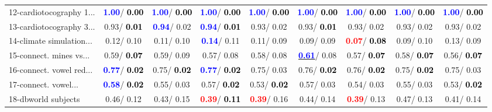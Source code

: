 \begin{table}[h]
\begin{center}
\begin{tabular}{lc|c|c|c|c|c|c|c}
12-cardiotocography 1... & \textcolor{blue}{\textbf{  1.00}}/\textcolor{black}{\textbf{  0.00}} & \textcolor{blue}{\textbf{  1.00}}/\textcolor{black}{\textbf{  0.00}} & \textcolor{blue}{\textbf{  1.00}}/\textcolor{black}{\textbf{  0.00}} & \textcolor{blue}{\textbf{  1.00}}/\textcolor{black}{\textbf{  0.00}} & \textcolor{blue}{\textbf{  1.00}}/\textcolor{black}{\textbf{  0.00}} & \textcolor{blue}{\textbf{  1.00}}/\textcolor{black}{\textbf{  0.00}} & \textcolor{blue}{\textbf{  1.00}}/\textcolor{black}{\textbf{  0.00}} & \textcolor{blue}{\textbf{  1.00}}/\textcolor{black}{\textbf{  0.00}} \\
13-cardiotocography 3... &   0.93/\textcolor{black}{\textbf{  0.01}} & \textcolor{blue}{\textbf{  0.94}}/  0.02 & \textcolor{blue}{\textbf{  0.94}}/\textcolor{black}{\textbf{  0.01}} &   0.93/  0.02 &   0.93/\textcolor{black}{\textbf{  0.01}} &   0.93/  0.02 &   0.93/  0.02 &   0.93/  0.02 \\
14-climate simulation... &   0.12/  0.10 &   0.11/  0.10 & \textcolor{blue}{\textbf{  0.14}}/  0.11 &   0.11/  0.09 &   0.09/  0.09 & \textcolor{red}{\textbf{  0.07}}/\textcolor{black}{\textbf{  0.08}} &   0.09/  0.10 &   0.13/  0.09 \\ \hline
15-connect. mines vs... &   0.59/\textcolor{black}{\textbf{  0.07}} &   0.59/  0.09 &   0.57/  0.08 &   0.58/  0.08 & \underline{\textcolor{blue}{\textbf{  0.61}}}/  0.08 &   0.57/\textcolor{black}{\textbf{  0.07}} &   0.58/\textcolor{black}{\textbf{  0.07}} &   0.56/\textcolor{black}{\textbf{  0.07}} \\
16-connect. vowel red... & \textcolor{blue}{\textbf{  0.77}}/\textcolor{black}{\textbf{  0.02}} &   0.75/\textcolor{black}{\textbf{  0.02}} & \textcolor{blue}{\textbf{  0.77}}/\textcolor{black}{\textbf{  0.02}} &   0.75/  0.03 &   0.76/\textcolor{black}{\textbf{  0.02}} &   0.76/\textcolor{black}{\textbf{  0.02}} &   0.75/\textcolor{black}{\textbf{  0.02}} &   0.75/  0.03 \\
17-connect. vowel... & \textcolor{blue}{\textbf{  0.58}}/\textcolor{black}{\textbf{  0.02}} &   0.55/  0.03 &   0.57/\textcolor{black}{\textbf{  0.02}} &   0.53/\textcolor{black}{\textbf{  0.02}} &   0.57/  0.03 &   0.54/  0.03 &   0.55/  0.03 &   0.53/\textcolor{black}{\textbf{  0.02}} \\
18-dbworld subjects &   0.46/  0.12 &   0.43/  0.15 & \textcolor{red}{\textbf{  0.39}}/\textcolor{black}{\textbf{  0.11}} & \textcolor{red}{\textbf{  0.39}}/  0.16 &   0.44/  0.14 & \textcolor{red}{\textbf{  0.39}}/  0.13 &   0.47/  0.13 &   0.41/  0.14 \\

\end{tabular}
\end{center}
\end{table}
